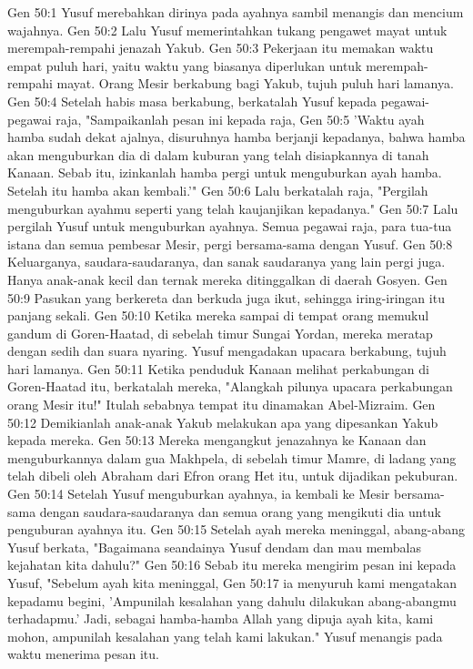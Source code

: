 Gen 50:1  Yusuf merebahkan dirinya pada ayahnya sambil menangis dan mencium wajahnya.
Gen 50:2  Lalu Yusuf memerintahkan tukang pengawet mayat untuk merempah-rempahi jenazah Yakub.
Gen 50:3  Pekerjaan itu memakan waktu empat puluh hari, yaitu waktu yang biasanya diperlukan untuk merempah-rempahi mayat. Orang Mesir berkabung bagi Yakub, tujuh puluh hari lamanya.
Gen 50:4  Setelah habis masa berkabung, berkatalah Yusuf kepada pegawai-pegawai raja, "Sampaikanlah pesan ini kepada raja,
Gen 50:5  'Waktu ayah hamba sudah dekat ajalnya, disuruhnya hamba berjanji kepadanya, bahwa hamba akan menguburkan dia di dalam kuburan yang telah disiapkannya di tanah Kanaan. Sebab itu, izinkanlah hamba pergi untuk menguburkan ayah hamba. Setelah itu hamba akan kembali.'"
Gen 50:6  Lalu berkatalah raja, "Pergilah menguburkan ayahmu seperti yang telah kaujanjikan kepadanya."
Gen 50:7  Lalu pergilah Yusuf untuk menguburkan ayahnya. Semua pegawai raja, para tua-tua istana dan semua pembesar Mesir, pergi bersama-sama dengan Yusuf.
Gen 50:8  Keluarganya, saudara-saudaranya, dan sanak saudaranya yang lain pergi juga. Hanya anak-anak kecil dan ternak mereka ditinggalkan di daerah Gosyen.
Gen 50:9  Pasukan yang berkereta dan berkuda juga ikut, sehingga iring-iringan itu panjang sekali.
Gen 50:10  Ketika mereka sampai di tempat orang memukul gandum di Goren-Haatad, di sebelah timur Sungai Yordan, mereka meratap dengan sedih dan suara nyaring. Yusuf mengadakan upacara berkabung, tujuh hari lamanya.
Gen 50:11  Ketika penduduk Kanaan melihat perkabungan di Goren-Haatad itu, berkatalah mereka, "Alangkah pilunya upacara perkabungan orang Mesir itu!" Itulah sebabnya tempat itu dinamakan Abel-Mizraim.
Gen 50:12  Demikianlah anak-anak Yakub melakukan apa yang dipesankan Yakub kepada mereka.
Gen 50:13  Mereka mengangkut jenazahnya ke Kanaan dan menguburkannya dalam gua Makhpela, di sebelah timur Mamre, di ladang yang telah dibeli oleh Abraham dari Efron orang Het itu, untuk dijadikan pekuburan.
Gen 50:14  Setelah Yusuf menguburkan ayahnya, ia kembali ke Mesir bersama-sama dengan saudara-saudaranya dan semua orang yang mengikuti dia untuk penguburan ayahnya itu.
Gen 50:15  Setelah ayah mereka meninggal, abang-abang Yusuf berkata, "Bagaimana seandainya Yusuf dendam dan mau membalas kejahatan kita dahulu?"
Gen 50:16  Sebab itu mereka mengirim pesan ini kepada Yusuf, "Sebelum ayah kita meninggal,
Gen 50:17  ia menyuruh kami mengatakan kepadamu begini, 'Ampunilah kesalahan yang dahulu dilakukan abang-abangmu terhadapmu.' Jadi, sebagai hamba-hamba Allah yang dipuja ayah kita, kami mohon, ampunilah kesalahan yang telah kami lakukan." Yusuf menangis pada waktu menerima pesan itu.

